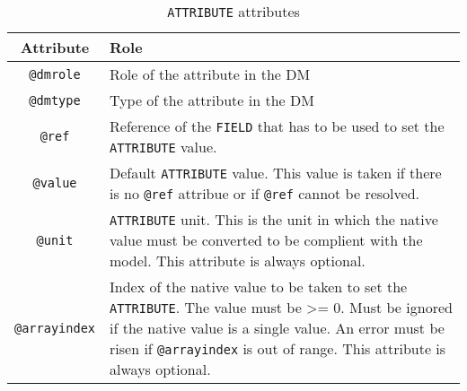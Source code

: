\begin{table}[!htbp]
\small
\centering
\begin{tabulary}{\linewidth}{|c|J|}       
       \hline 
            \textbf{Attribute} & 
            \textbf {Role}\\
       \hline         \hline  
            \texttt{@dmrole} & 
            Role of the attribute in the DM\\
        \hline 
            \texttt{@dmtype} & 
            Type of the attribute in the DM\\
        \hline 
            \texttt{@ref} & 
            Reference of the \texttt{FIELD} that has to be used to set the 
            \texttt{ATTRIBUTE} value.\\
        \hline 
            \texttt{@value}  &
            Default \texttt{ATTRIBUTE} value. This value is taken if there is no 
            \texttt{@ref} attribue or if \texttt{@ref} cannot be resolved.\\
        \hline 
            \texttt{@unit} & 
            \texttt{ATTRIBUTE} unit. This is the unit in which the native value must be 
            converted to be complient with the model. This attribute is always optional.\\
        \hline 
            \texttt{@arrayindex} & 
            Index of the native value to be taken to set the \texttt{ATTRIBUTE}. 
            The value must be >= 0.
            Must be ignored if the native value is a single value. 
            An error must be risen if \texttt{@arrayindex} is out of range.
            This attribute is always optional.\\
        \hline 
     \end{tabulary}
     \caption{\texttt{ATTRIBUTE} attributes} 
     \label{tbl:attribute-att}
 \end{table}


